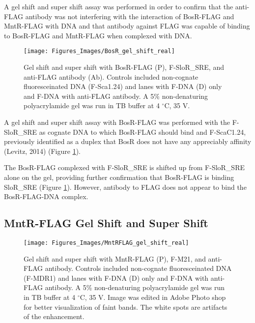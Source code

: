 \documentclass[12pt,twoside]{reedthesis}
\begin{document}
A gel shift and super shift assay was performed in order to confirm that the anti-FLAG antibody was not interfering with the interaction of  BosR-FLAG and MntR-FLAG with DNA and that antibody against FLAG was capable of binding to BosR-FLAG and MntR-FLAG when complexed with DNA. 


	\begin{figure}[h!tbp]
			
			\centering
			\texttt{[image: Figures\_Images/BosR\_gel\_shift\_real]}
			\caption[BosR-FLAG Gel Shift]{Gel shift and super shift with BosR-FLAG (P), F-SloR\_SRE, and anti-FLAG antibody (Ab). Controls included non-cognate fluoresceinated DNA (F-Sca1.24) and lanes with F-DNA (D) only and F-DNA with anti-FLAG antibody. A 5\% non-denaturing polyacrylamide gel was run in TB buffer at 4 $^{\circ}$C, 35 V. }
			\label{GelShift_BosRFLAG}
		\end{figure}
		
		 
		 
A gel shift and super shift assay with BosR-FLAG was performed with the F-SloR\_SRE as cognate DNA to which BosR-FLAG should bind and F-ScaC1.24, previously identified as a duplex that BosR does not have any appreciably affinity (Levitz, 2014) (Figure \ref{GelShift_BosRFLAG}). 

The BosR-FLAG complexed with F-SloR\_SRE is shifted up from F-SloR\_SRE alone on the gel, providing further confirmation that BosR-FLAG is binding SloR\_SRE (Figure \ref{GelShift_BosRFLAG}). However, antibody to FLAG does not appear to bind the BosR-FLAG-DNA complex.  
\subsection{MntR-FLAG Gel Shift and Super Shift}


		\begin{figure}[h!tbp]
			
			\centering
			\texttt{[image: Figures\_Images/MntRFLAG\_gel\_shift\_real]}
			\caption[MntR-FLAG Gel Shift]{Gel shift and super shift with MntR-FLAG (P), F-M21, and anti-FLAG antibody. Controls included non-cognate fluoresceinated DNA (F-MDR1) and lanes with F-DNA (D) only and F-DNA with anti-FLAG antibody.  A 5\% non-denaturing polyacrylamide gel was run in TB buffer at 4 $^{\circ}$C, 35 V. Image was edited in Adobe Photo shop for better visualization of faint bands. The white spots are artifacts of the enhancement.} 
			\label{GelShift_MntRFLAG}
		\end{figure}
		
\end{document}
